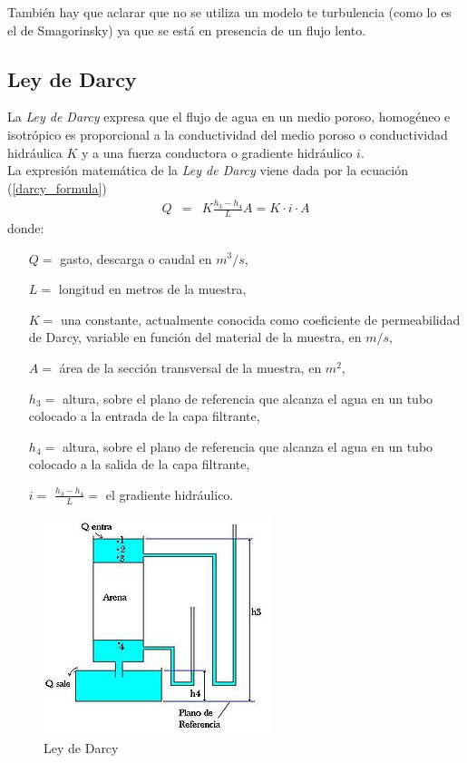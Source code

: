 \documentclass[10pt,a4paper,final]{article}
\begin{document}
También hay que aclarar que no se utiliza un modelo te turbulencia (como lo es el de Smagorinsky) ya que se está en presencia de un flujo lento.
\subsection{Ley de Darcy}
La \emph{Ley de Darcy} expresa que el flujo de agua en un medio poroso, homogéneo e isotrópico es proporcional 
a la conductividad del medio poroso o conductividad hidráulica $K$ y a una fuerza conductora o gradiente hidráulico $i$.
\\
La expresión matemática de la \emph{Ley de Darcy} viene dada por la ecuación (\ref{darcy_formula})
\begin{eqnarray}
Q&=&K \frac{h_3 - h_4}{L} A = K \cdot i \cdot A \label{darcy_formula}
\end{eqnarray}
donde:
\begin{itemize}
	\item[$Q=$] gasto, descarga o caudal en $m^3/s$,
	\item[$L=$] longitud en metros de la muestra,
	\item[$K=$] una constante, actualmente conocida como coeficiente de permeabilidad de Darcy, variable en función del material de la muestra, en $m/s$,
	\item[$A=$] área de la sección transversal de la muestra, en $m^2$,
	\item[$h_3=$] altura, sobre el plano de referencia que alcanza el agua en un tubo colocado a la entrada de la capa filtrante,
	\item[$h_4=$] altura, sobre el plano de referencia que alcanza el agua en un tubo colocado a la salida de la capa filtrante,
	\item[$i=$] $\frac{h_3 - h_4}{L}=$ el gradiente hidráulico.
\end{itemize}
%
\begin{figure}[tbhp]
\centerline{\includegraphics[scale=0.6]{img/darcy_grafica}}
\caption{Ley de Darcy}
\label{graf_leydarcy}
\end{figure}
\end{document}
